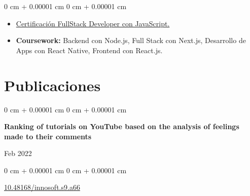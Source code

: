 \documentclass[10pt, letterpaper]{article}
\newenvironment{highlights}{
    \begin{itemize}[
        topsep=0.10 cm,
        parsep=0.10 cm,
        partopsep=0pt,
        itemsep=0pt,
        leftmargin=0 cm + 10pt
    ]
}{
    \end{itemize}
} %
\newenvironment{onecolentry}{
    \begin{adjustwidth}{
        0 cm + 0.00001 cm
    }{
        0 cm + 0.00001 cm
    }
}{
    \end{adjustwidth}
} %
\newenvironment{twocolentry}[2][]{
    \onecolentry
    \def\secondColumn{#2}
    \setcolumnwidth{\fill, 4.5 cm}
    \begin{paracol}{2}
}{
    \switchcolumn \raggedleft \secondColumn
    \end{paracol}
    \endonecolentry
} %
\begin{document}
        \vspace{0.10 cm}
        \begin{onecolentry}
            \begin{highlights}
                \item \href{https://platzi.com/p/fabriciocendecar/ruta/100-javascript-full-stack/diploma/detalle/}{Certificación FullStack Developer con JavaScript.}
                \item \textbf{Coursework:} Backend con Node.js, Full Stack con Next.js, Desarrollo de Apps con React Native, Frontend con React.js.
            \end{highlights}
        \end{onecolentry}


       
    \section{Publicaciones}



        
        \begin{samepage}
            \begin{twocolentry}{
                Feb 2022
            }
                \textbf{Ranking of tutorials on YouTube based on the analysis of feelings made to their comments}
            \end{twocolentry}

            \vspace{0.10 cm}
            
            \begin{onecolentry}
                

                \vspace{0.10 cm}
                
        \href{https://doi.org/10.48168/innosoft.s9.a66}{10.48168/innosoft.s9.a66}
        \end{onecolentry}
        \end{samepage}


    
        
\end{document}
